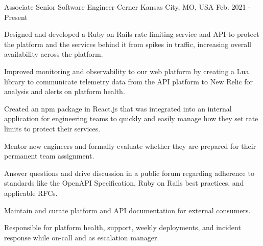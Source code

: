 

\begin{cventries}

  \cventry
    {Associate Senior Software Engineer} %
    {Cerner} %
    {Kansas City, MO, USA} %
    {Feb. 2021 - Present} %
    {
      \begin{cvitems} %
        \item {Designed and developed a Ruby on Rails rate limiting service and API to protect the platform and the services behind it from spikes in traffic, increasing overall availability across the platform.}
        \item {Improved monitoring and observability to our web platform by creating a Lua library to communicate telemetry data from the API platform to New Relic for analysis and alerts on platform health.}
        \item {Created an npm package in React.js that was integrated into an internal application for engineering teams to quickly and easily manage how they set rate limits to protect their services.}
        \item {Mentor new engineers and formally evaluate whether they are prepared for their permanent team assignment.}
        \item {Answer questions and drive discussion in a public forum regarding adherence to standards like the OpenAPI Specification, Ruby on Rails best practices, and applicable RFCs.}
        \item {Maintain and curate platform and API documentation for external consumers.}
        \item {Responsible for platform health, support, weekly deployments, and incident response while on-call and as escalation manager.}
      \end{cvitems}
    }


\end{cventries}
